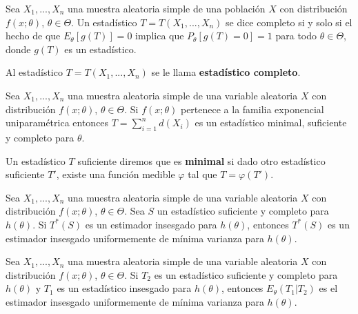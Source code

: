 \begin{defi}
    Sea $X_1,...,X_n$ una muestra aleatoria simple de una población $X$ con distribución $f(x;\theta)$, $\theta \in \Theta$. Un estadístico $T = T(X_1,...,X_n)$ se dice completo si y solo si el hecho de que $E_{\theta}[g(T)] = 0$ implica que $P_{\theta}[g(T) = 0] = 1$ para todo $\theta \in \Theta$, donde $g(T)$ es un estadístico.

    Al estadístico $T = T(X_1,...,X_n)$ se le llama \textbf{estadístico completo}.
\end{defi}

\begin{teo}
    Sea $X_1,...,X_n$ una muestra aleatoria simple de una variable aleatoria $X$ con distribución $f(x;\theta)$, $\theta \in \Theta$. Si $f(x;\theta)$ pertenece a la familia exponencial uniparamétrica entonces $T = \sum_{i=1}^{n}{d(X_i)}$ es un estadístico minimal, suficiente y completo para $\theta$.
\end{teo}

\begin{defi}
    Un estadístico $T$ suficiente diremos que es \textbf{minimal} si dado otro estadístico suficiente $T'$, existe una función medible $\varphi$ tal que $T = \varphi(T')$.
\end{defi}

\begin{teo}
    Sea $X_1,...,X_n$ una muestra aleatoria simple de una variable aleatoria $X$ con distribución $f(x;\theta)$, $\theta \in \Theta$. Sea $S$ un estadístico suficiente y completo para $h(\theta)$. Si $T^*(S)$ es un estimador insesgado para $h(\theta)$, entonces $T^*(S)$ es un estimador insesgado uniformemente de mínima varianza para $h(\theta)$.
\end{teo}

\begin{teo}
    Sea $X_1,...,X_n$ una muestra aleatoria simple de una variable aleatoria $X$ con distribución $f(x;\theta)$, $\theta \in \Theta$. Si $T_2$ es un estadístico suficiente y completo para $h(\theta)$ y $T_1$ es un estadístico insesgado para $h(\theta)$, entonces $E_{\theta}(T_1 | T_2)$ es el estimador insesgado uniformemente de mínima varianza para $h(\theta)$.
\end{teo}
